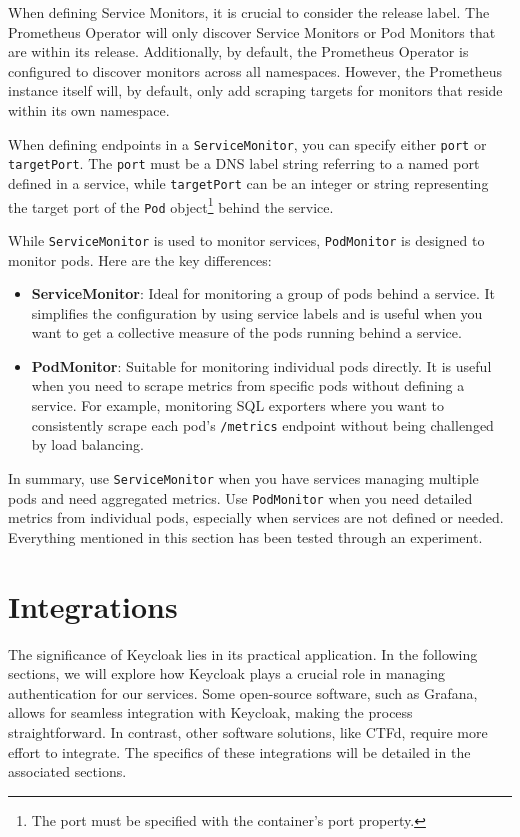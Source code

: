 When defining Service Monitors, it is crucial to consider the release label. The Prometheus Operator will only discover Service Monitors or Pod Monitors that are within its release. Additionally, by default, the Prometheus Operator is configured to discover monitors across all namespaces. However, the Prometheus instance itself will, by default, only add scraping targets for monitors that reside within its own namespace.

When defining endpoints in a \texttt{ServiceMonitor}, you can specify either \texttt{port} or \texttt{targetPort}. The \texttt{port} must be a DNS label string referring to a named port defined in a service, while \texttt{targetPort} can be an integer or string representing the target port of the \texttt{Pod} object\footnote{The port must be specified with the container's port property.} behind the service.

While \texttt{ServiceMonitor} is used to monitor services, \texttt{PodMonitor} is designed to monitor pods. Here are the key differences:

\begin{itemize}
    \item \textbf{ServiceMonitor}: Ideal for monitoring a group of pods behind a service. It simplifies the configuration by using service labels and is useful when you want to get a collective measure of the pods running behind a service.
    \item \textbf{PodMonitor}: Suitable for monitoring individual pods directly. It is useful when you need to scrape metrics from specific pods without defining a service. For example, monitoring SQL exporters where you want to consistently scrape each pod's \texttt{/metrics} endpoint without being challenged by load balancing.
\end{itemize}

In summary, use \texttt{ServiceMonitor} when you have services managing multiple pods and need aggregated metrics. Use \texttt{PodMonitor} when you need detailed metrics from individual pods, especially when services are not defined or needed. Everything mentioned in this section has been tested through an experiment.

\section{Integrations}
The significance of Keycloak lies in its practical application. In the following sections, we will explore how Keycloak plays a crucial role in managing authentication for our services. Some open-source software, such as Grafana, allows for seamless integration with Keycloak, making the process straightforward. In contrast, other software solutions, like CTFd, require more effort to integrate. The specifics of these integrations will be detailed in the associated sections.

